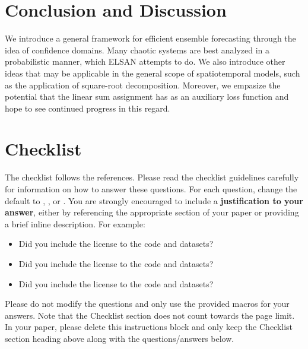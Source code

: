 \documentclass{article}
\begin{document}
\section{Conclusion and Discussion}

We introduce a general framework for efficient ensemble forecasting through the idea of confidence domains. Many chaotic systems are best analyzed in a probabilistic manner, which ELSAN attempts to do. We also introduce other ideas that may be applicable in the general scope of spatiotemporal models, such as the application of square-root decomposition. Moreover, we empasize the potential that the linear sum assignment has as an auxiliary loss function and hope to see continued progress in this regard.



\section*{Checklist}


The checklist follows the references.  Please
read the checklist guidelines carefully for information on how to answer these
questions.  For each question, change the default \answerTODO{} to \answerYes{},
\answerNo{}, or \answerNA{}.  You are strongly encouraged to include a {\bf
justification to your answer}, either by referencing the appropriate section of
your paper or providing a brief inline description.  For example:
\begin{itemize}
  \item Did you include the license to the code and datasets? 
  \item Did you include the license to the code and datasets? 
  \item Did you include the license to the code and datasets? \answerNA{}
\end{itemize}
Please do not modify the questions and only use the provided macros for your
answers.  Note that the Checklist section does not count towards the page
limit.  In your paper, please delete this instructions block and only keep the
Checklist section heading above along with the questions/answers below.
\end{document}
